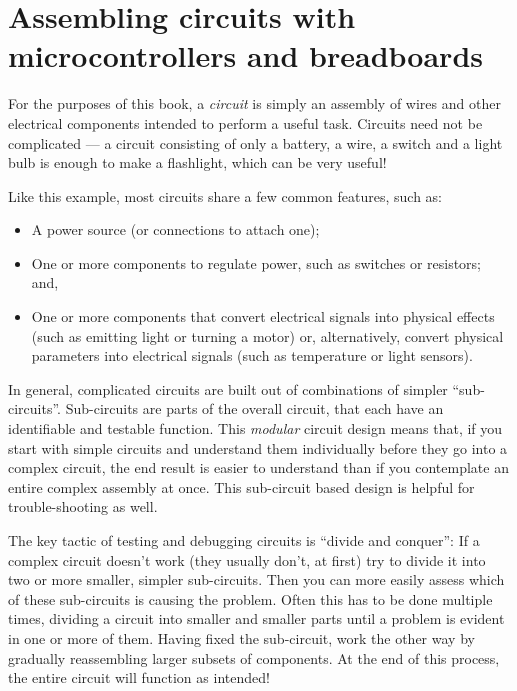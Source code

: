 \section{Assembling circuits with microcontrollers and breadboards}
For the purposes of this book, a \emph{circuit} is simply an assembly of wires and other electrical components intended to perform a useful task. 
Circuits need not be complicated --- a circuit consisting of only a battery, a wire, a switch and a light bulb is enough to make a flashlight, which can be very useful! 

Like this example, most circuits share a few common features, such as:
\begin{itemize}
	 \item A power source (or connections to attach one);
	 \item One or more components to regulate power, such as switches or resistors; and,
	 \item One or more components that convert electrical signals into physical effects (such as emitting light or turning a motor) or, alternatively, convert physical parameters into electrical signals (such as temperature or light sensors). 
\end{itemize}

In general, complicated circuits are built out of combinations of simpler ``sub-circuits''. Sub-circuits are parts of the overall circuit, that each have an identifiable and testable function. 
This \emph{modular} circuit design means that, if you start with simple circuits and understand them individually before they go into a complex circuit, the end result is easier to understand than if you contemplate an entire complex assembly at once. 
This sub-circuit based design is helpful for trouble-shooting as well.
	\begin{kaobox}[frametitle=Divide and conquer!]
		The key tactic of testing and debugging circuits is ``divide and conquer'': 
		If a complex circuit doesn't work (they usually don't, at first) try to divide it into two or more smaller, simpler sub-circuits.
		Then you can more easily assess which of these sub-circuits is causing the problem. 
		Often this has to be done multiple times, dividing a circuit into smaller and smaller parts until a problem is evident in one or more of them. 
		Having fixed the sub-circuit, work the other way by gradually reassembling larger subsets of components. 
		At the end of this process, the entire circuit will function as intended!
	\end{kaobox}

